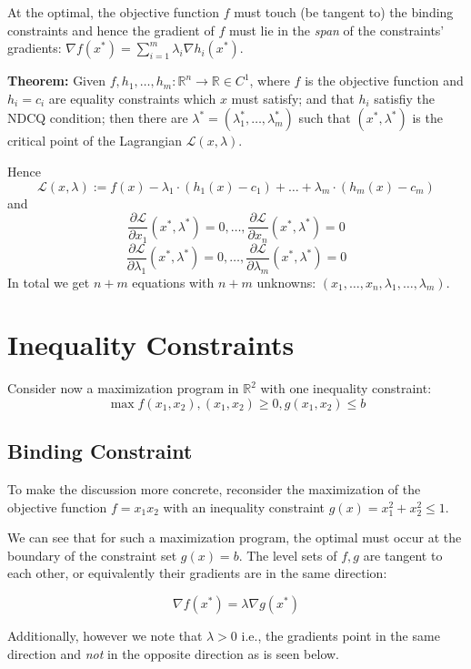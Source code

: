 \documentclass[11pt,]{article}
\begin{document}
At the optimal, the objective function \(f\) must touch (be tangent to)
the binding constraints and hence the gradient of \(f\) must lie in the
\emph{span} of the constraints' gradients:
\(\nabla f(x^*)=\sum_{i=1}^m \lambda_i \nabla h_i(x^*)\).

\textbf{Theorem:} Given
\(f, h_1, \hdots, h_m:\mathbb{R}^n\to \mathbb{R}\in C^1\), where \(f\)
is the objective function and \(h_i=c_i\) are equality constraints which
\(x\) must satisfy; and that \(h_i\) satisfiy the NDCQ condition; then
there are \(\lambda^*=(\lambda_1^*,\hdots,\lambda_m^*)\) such that
\((x^*,\lambda^*)\) is the critical point of the Lagrangian
\(\mathcal{L}(x,\lambda)\).

Hence \[
\mathcal{L}(x,\lambda) := f(x)-\lambda_1\cdot(h_1(x)-c_1)+\hdots+\lambda_m\cdot(h_m(x)-c_m)
\] and \[
\frac{\partial\mathcal{L}}{\partial x_1}(x^*,\lambda^*)=0,\hdots,\frac{\partial \mathcal{L}}{\partial x_n}(x^*,\lambda^*)=0
\] \[
\frac{\partial\mathcal{L}}{\partial \lambda_1}(x^*,\lambda^*)=0,\hdots,\frac{\partial \mathcal{L}}{\partial \lambda_m}(x^*,\lambda^*)=0
\] In total we get \(n+m\) equations with \(n+m\) unknowns:
\((x_1,\hdots,x_n,\lambda_1,\hdots,\lambda_m)\).

\section{Inequality Constraints}\label{inequality-constraints}

Consider now a maximization program in \(\mathbb{R}^2\) with one
inequality constraint: \[
\max f(x_1, x_2), (x_1, x_2)\geq 0, g(x_1, x_2)\leq b
\]

\subsection{Binding Constraint}\label{binding-constraint}

To make the discussion more concrete, reconsider the maximization of the
objective function \(f=x_1x_2\) with an inequality constraint
\(g(x) = x_1^2+x_2^2\leq 1\).

We can see that for such a maximization program, the optimal must occur
at the boundary of the constraint set \(g(x)=b\). The level sets of
\(f, g\) are tangent to each other, or equivalently their gradients are
in the same direction:

\[\nabla f(x^*) = \lambda \nabla g(x^*)\]

Additionally, however we note that \(\lambda > 0\) i.e., the gradients
point in the same direction and \emph{not} in the opposite direction as
is seen below.
\end{document}

